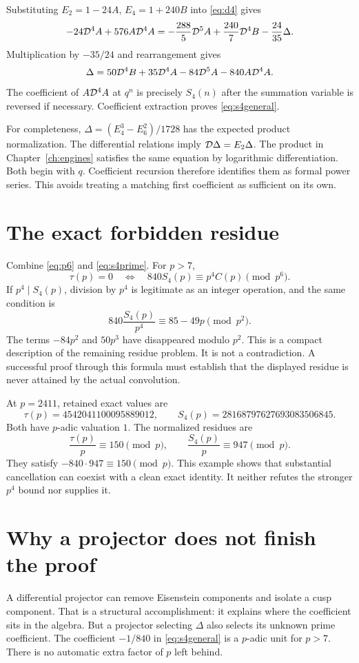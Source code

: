 Substituting $E_2=1-24A$, $E_4=1+240B$ into \eqref{eq:d4} gives
\[
-24\mathcal D^4A+576A\mathcal D^4A
=-\frac{288}{5}\mathcal D^5A+\frac{240}{7}\mathcal D^4B-\frac{24}{35}\Delta.
\]
Multiplication by $-35/24$ and rearrangement gives
\begin{equation}\label{eq:projector}
\Delta=50\mathcal D^4B+35\mathcal D^4A-84\mathcal D^5A-840A\mathcal D^4A.
\end{equation}
The coefficient of $A\mathcal D^4A$ at $q^n$ is precisely $S_4(n)$ after the summation variable is reversed if necessary. Coefficient extraction proves \eqref{eq:s4general}.

For completeness, $\Delta=(E_4^3-E_6^2)/1728$ has the expected product normalization. The differential relations imply $\mathcal D\Delta=E_2\Delta$. The product in Chapter~\ref{ch:engines} satisfies the same equation by logarithmic differentiation. Both begin with $q$. Coefficient recursion therefore identifies them as formal power series. This avoids treating a matching first coefficient as sufficient on its own.

\section{The exact forbidden residue}
Combine \eqref{eq:p6} and \eqref{eq:s4prime}. For $p>7$,
\begin{equation}\label{eq:forbiddenconvolution}
\tau(p)=0\quad\Longleftrightarrow\quad
840S_4(p)\equiv p^4C(p)\pmod{p^6}.
\end{equation}
If $p^4\mid S_4(p)$, division by $p^4$ is legitimate as an integer operation, and the same condition is
\[
840\frac{S_4(p)}{p^4}\equiv85-49p\pmod{p^2}.
\]
The terms $-84p^2$ and $50p^3$ have disappeared modulo $p^2$. This is a compact description of the remaining residue problem. It is not a contradiction. A successful proof through this formula must establish that the displayed residue is never attained by the actual convolution.

At $p=2411$, retained exact values are
\[
\tau(p)=4542041100095889012,\qquad
S_4(p)=28168797627693083506845.
\]
Both have $p$-adic valuation $1$. The normalized residues are
\[
\frac{\tau(p)}p\equiv150\pmod p,\qquad
\frac{S_4(p)}p\equiv947\pmod p.
\]
They satisfy $-840\cdot947\equiv150\pmod p$. This example shows that substantial cancellation can coexist with a clean exact identity. It neither refutes the stronger $p^4$ bound nor supplies it.

\section{Why a projector does not finish the proof}
A differential projector can remove Eisenstein components and isolate a cusp component. That is a structural accomplishment: it explains where the coefficient sits in the algebra. But a projector selecting $\Delta$ also selects its unknown prime coefficient. The coefficient $-1/840$ in \eqref{eq:s4general} is a $p$-adic unit for $p>7$. There is no automatic extra factor of $p$ left behind.

